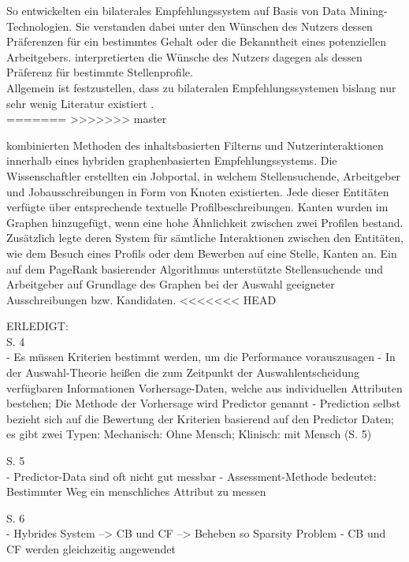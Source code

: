 \newpage
So entwickelten \textcite[S. 1ff.]{applyingDataMining:2014} ein bilaterales Empfehlungssystem auf Basis von Data Mining-Technologien. Sie verstanden dabei unter den Wünschen des Nutzers dessen Präferenzen für ein bestimmtes Gehalt oder die Bekanntheit eines potenziellen Arbeitgebers. \textcite[S. 4ff.]{malinowski:2006} interpretierten die Wünsche des Nutzers dagegen als dessen Präferenz für bestimmte Stellenprofile.\\
Allgemein ist festzustellen, dass zu bilateralen Empfehlungssystemen bislang nur sehr wenig Literatur existiert \cite[S. 2f.]{jobRecommenderSystemsASurvey:2012}.\\
=======
>>>>>>> master

\textcite[S. 1ff.]{lu:2013} kombinierten Methoden des inhaltsbasierten Filterns und Nutzerinteraktionen innerhalb eines hybriden graphenbasierten Empfehlungssystems. Die Wissenschaftler erstellten ein Jobportal, in welchem Stellensuchende, Arbeitgeber und Jobausschreibungen in Form von Knoten existierten. Jede dieser Entitäten verfügte über entsprechende textuelle Profilbeschreibungen. Kanten wurden im Graphen hinzugefügt, wenn eine hohe Ähnlichkeit zwischen zwei Profilen bestand. Zusätzlich legte deren System für sämtliche Interaktionen zwischen den Entitäten, wie dem Besuch eines Profils oder dem Bewerben auf eine Stelle, Kanten an. Ein auf dem PageRank basierender Algorithmus unterstützte Stellensuchende und Arbeitgeber auf Grundlage des Graphen bei der Auswahl geeigneter Ausschreibungen bzw. Kandidaten.
<<<<<<< HEAD

ERLEDIGT:
\textcite{faerber:2003}\\
S. 4\\
- Es müssen Kriterien bestimmt werden, um die Performance vorauszusagen
- In der Auswahl-Theorie heißen die zum Zeitpunkt der Auswahlentscheidung verfügbaren Informationen Vorhersage-Daten, welche aus individuellen Attributen bestehen; Die Methode der Vorhersage wird Predictor genannt
- Prediction selbst bezieht sich auf die Bewertung der Kriterien basierend auf den Predictor Daten; es gibt zwei Typen: Mechanisch: Ohne Mensch; Klinisch: mit Mensch (S. 5)

S. 5\\
- Predictor-Data sind oft nicht gut messbar
- Assessment-Methode bedeutet: Bestimmter Weg ein menschliches Attribut zu messen

S. 6\\
- Hybrides System --> CB und CF --> Beheben so Sparsity Problem
- CB und CF werden gleichzeitig angewendet

